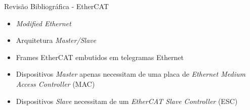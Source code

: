 \begin{frame}{Revis\~{a}o Bibliogr\'{a}fica - EtherCAT}
	\large
	\begin{itemize}
		\item \emph{Modified Ethernet}
		\item Arquitetura \emph{Master/Slave}
		\item Frames EtherCAT embutidos em telegramas Ethernet
		\item Dispositivos \emph{Master} apenas necessitam de uma placa de \emph{Ethernet Medium Access Controller} (MAC)
		\item Dispositivos \emph{Slave} necessitam de um \emph{EtherCAT Slave Controller} (ESC)
	\end{itemize}
\end{frame}